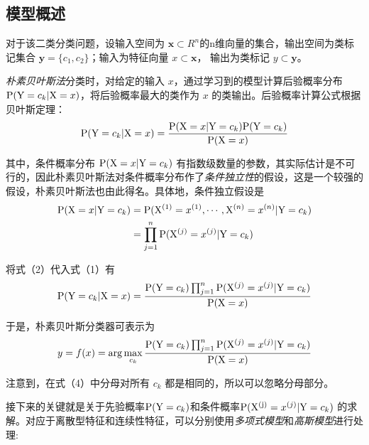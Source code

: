 \documentclass[UTF8,cs4size]{ctexart}
\begin{document}
\subsection{\heiti 模型概述}
对于该二类分类问题，设输入空间为 $\mathbf{x} \subset R^n$的n维向量的集合，输出空间为类标记集合 $ \mathbf{y} = \{c_1,c_2\} $；输入为特征向量 $ x \subset \mathbf{x} $，
输出为类标记 $ y \subset \mathbf{y} $。
\vspace{3ex}
\par \emph{朴素贝叶斯法}分类时，对给定的输入 $x$，通过学习到的模型计算后验概率分布 $ {\rm P}({\rm Y}=c_k|{\rm X}=x) $，将后验概率最大的类作为 $x$ 的类输出。后验概率计算公式根据贝叶斯定理：
\begin{equation}
 {\rm P}({\rm Y}=c_k|{\rm X}=x)  = \frac{{\rm P}({\rm X}=x|{\rm Y}=c_k) {\rm P}({\rm Y}=c_k)}{{\rm P}({\rm X}=x)}
\end{equation}

\noindent 其中，条件概率分布 ${\rm P}({\rm X}=x|{\rm Y}=c_k)$ 有指数级数量的参数，其实际估计是不可行的，因此朴素贝叶斯法对条件概率分布作了\emph{条件独立性}的假设，这是一个较强的假设，朴素贝叶斯法也由此得名。具体地，条件独立假设是
\begin{equation}
\begin{aligned}
{\rm P}({\rm X}=x|{\rm Y}=c_k) 
	&={\rm P}({\rm X^{(1)}}=x^{(1)},\cdots,{\rm X}^{(n)}=x^{(n)}|{\rm Y}=c_k) \\
   &=\prod_{j=1}^{n}{{\rm P}({\rm X}^{(j)}=x^{(j)}|{\rm Y}=c_k)}
\end{aligned}
\end{equation}

\noindent 将式（2）代入式（1）有
\begin{equation}
 {\rm P}({\rm Y}=c_k|{\rm X}=x)  = \frac{ {\rm P}({\rm Y}=c_k)\prod_{j=1}^{n}{{\rm P}({\rm X}^{(j)}=x^{(j)}|{\rm Y}=c_k)}}{{\rm P}({\rm X}=x)}
\end{equation}

\noindent 于是，朴素贝叶斯分类器可表示为
\begin{equation}
 y = f(x) = \arg\max_{c_k}\frac{ {\rm P}({\rm Y}=c_k)\prod_{j=1}^{n}{{\rm P}({\rm X}^{(j)}=x^{(j)}|{\rm Y}=c_k)}}{{\rm P}({\rm X}=x)}
\end{equation}

\noindent 注意到，在式（4）中分母对所有 $c_k$ 都是相同的，所以可以忽略分母部分。

\vspace{3ex}
\par 接下来的关键就是关于先验概率${\rm P}({\rm Y}=c_k)$和条件概率${\rm P}({\rm X^{(j)}}=x^{(j)}|{\rm Y}=c_k)$ 的求解。对应于离散型特征和连续性特征，可以分别使用\emph{多项式模型}和\emph{高斯模型}进行处理:
\end{document}
